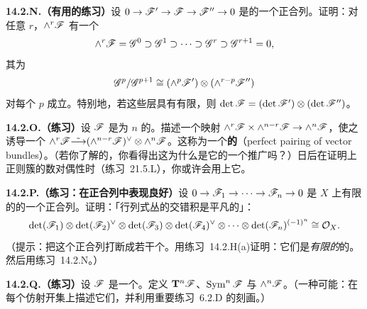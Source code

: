 \textbf{14.2.N.（有用的练习）}\quad 设 $0\to\mathscr{F}'\to\mathscr{F}\to\mathscr{F}''\to 0$ 是\trLocallyFreeSheaf{}的一个正合列。证明：对任意 $r$，$\wedge^r\mathscr{F}$ 有一个\trFiltration
\[
\wedge^r\mathscr{F}=\mathscr{G}^0\supset\mathscr{G}^1\supset\cdots\supset\mathscr{G}^r\supset\mathscr{G}^{r+1}=0,
\]
其\trSubquotient{}为
\[
\mathscr{G}^p/\mathscr{G}^{p+1}\cong(\wedge^p\mathscr{F}')\otimes(\wedge^{r-p}\mathscr{F}'')
\]
对每个 $p$ 成立。特别地，若这些层具有有限\trRank，则 $\det\mathscr{F}=(\det\mathscr{F}')\otimes(\det\mathscr{F}'')$。

\textbf{14.2.O.（练习）}\quad 设 $\mathscr{F}$ 是\trRank{}为 $n$ 的\trLocallyFreeSheaf。描述一个映射 $\wedge^r\mathscr{F}\times\wedge^{n-r}\mathscr{F}\to\wedge^n\mathscr{F}$，使之诱导一个\trIsomorphism{} $\wedge^r\mathscr{F}\tilde{\longrightarrow}(\wedge^{n-r}\mathscr{F})^{\vee}\otimes\wedge^n\mathscr{F}$。这称为一个\textbf{\trVectorBundle{}的\trPerfectPairing}（perfect pairing of vector bundles）。（若你了解\trVectorSpace{}的\trPerfectPairing，你看得出这为什么是它的一个推广吗？）日后在证明\trAlgClosedField{}上正则簇的\trHodge{}数对偶性时（\mbox{练习~21.5.L}），你或许会用上它。

\textbf{14.2.P.（练习：\trDeterminant{}\trLineBundle{}在正合列中表现良好）}\quad 设 $0\to\mathscr{F}_1\to\cdots\to\mathscr{F}_n\to 0$ 是 $X$ 上有限\trRank{}的\trLocallyFreeSheaf{}的一个正合列。证明：「行列式丛的交错积是平凡的」：
\[
\det(\mathscr{F}_1)\otimes\det(\mathscr{F}_2)^{\vee}\otimes\det(\mathscr{F}_3)\otimes\det(\mathscr{F}_4)^{\vee}\otimes\cdots\otimes\det(\mathscr{F}_n)^{(-1)^n}\cong\mathcal{O}_X.
\]
（提示：把这个正合列打断成若干个\trShortExactSequence。用\mbox{练习~14.2.H(a)}证明：它们是\emph{有限\trRank{}的\trLocallyFreeSheaf}的\trShortExactSequence。然后用\mbox{练习~14.2.N}。）

\textbf{14.2.Q.（练习）}\quad 设 $\mathscr{F}$ 是一个\trQCSheaf。定义\trQCSheaf{} $\mathbf{T}^n\mathscr{F}$、$\operatorname{Sym}^n\mathscr{F}$ 与 $\wedge^n\mathscr{F}$。（一种可能：在每个仿射开集上描述它们，并利用重要练习~6.2.D 的刻画。）
